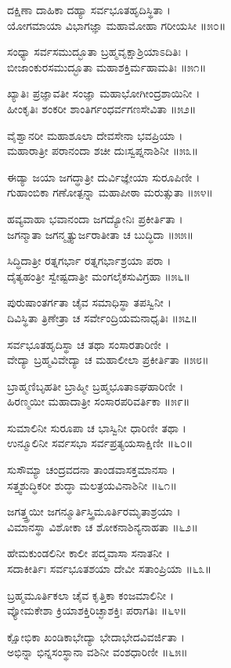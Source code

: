 ದಕ್ಷಿಣಾ ದಾಹಿಕಾ ದಹ್ಯಾ ಸರ್ವಭೂತಹೃದಿಸ್ಥಿತಾ ।\\
ಯೋಗಮಾಯಾ ವಿಭಾಗಜ್ಞಾ ಮಹಾಮೋಹಾ ಗರೀಯಸೀ ॥೫೦॥

ಸಂಧ್ಯಾ ಸರ್ವಸಮುದ್ಭೂತಾ ಬ್ರಹ್ಮವೃಕ್ಷಾಶ್ರಿಯಾಽದಿತಿಃ ।\\
ಬೀಜಾಂಕುರಸಮುದ್ಭೂತಾ ಮಹಾಶಕ್ತಿರ್ಮಹಾಮತಿಃ ॥೫೧॥

ಖ್ಯಾತಿಃ ಪ್ರಜ್ಞಾವತೀ ಸಂಜ್ಞಾ ಮಹಾಭೋಗೀಂದ್ರಶಾಯಿನೀ ।\\
ಹೀಂಕೃತಿಃ ಶಂಕರೀ ಶಾಂತಿರ್ಗಂಧರ್ವಗಣಸೇವಿತಾ ॥೫೨॥

ವೈಶ್ವಾನರೀ ಮಹಾಶೂಲಾ ದೇವಸೇನಾ ಭವಪ್ರಿಯಾ ।\\
ಮಹಾರಾತ್ರೀ ಪರಾನಂದಾ ಶಚೀ ದುಃಸ್ವಪ್ನನಾಶಿನೀ ॥೫೩॥

ಈಡ್ಯಾ ಜಯಾ ಜಗದ್ಧಾತ್ರೀ ದುರ್ವಿಜ್ಞೇಯಾ ಸುರೂಪಿಣೀ ।\\
ಗುಹಾಂಬಿಕಾ ಗಣೋತ್ಪನ್ನಾ ಮಹಾಪೀಠಾ ಮರುತ್ಸುತಾ ॥೫೪॥

ಹವ್ಯವಾಹಾ ಭವಾನಂದಾ ಜಗದ್ಯೋನಿಃ ಪ್ರಕೀರ್ತಿತಾ ।\\
ಜಗನ್ಮಾತಾ ಜಗನ್ಮೃತ್ಯುರ್ಜರಾತೀತಾ ಚ ಬುದ್ಧಿದಾ ॥೫೫॥

ಸಿದ್ಧಿದಾತ್ರೀ ರತ್ನಗರ್ಭಾ ರತ್ನಗರ್ಭಾಶ್ರಯಾ ಪರಾ ।\\
ದೈತ್ಯಹಂತ್ರೀ ಸ್ವೇಷ್ಟದಾತ್ರೀ ಮಂಗಲೈಕಸುವಿಗ್ರಹಾ ॥೫೬॥

ಪುರುಷಾಂತರ್ಗತಾ ಚೈವ ಸಮಾಧಿಸ್ಥಾ ತಪಸ್ವಿನೀ ।\\
ದಿವಿಸ್ಥಿತಾ ತ್ರಿಣೇತ್ರಾ ಚ ಸರ್ವೇಂದ್ರಿಯಮನಾಧೃತಿಃ ॥೫೭॥

ಸರ್ವಭೂತಹೃದಿಸ್ಥಾ ಚ ತಥಾ ಸಂಸಾರತಾರಿಣೀ ।\\
ವೇದ್ಯಾ ಬ್ರಹ್ಮವಿವೇದ್ಯಾ ಚ ಮಹಾಲೀಲಾ ಪ್ರಕೀರ್ತಿತಾ ॥೫೮॥

ಬ್ರಾಹ್ಮಣಿಬೃಹತೀ ಬ್ರಾಹ್ಮೀ ಬ್ರಹ್ಮಭೂತಾಽಘಹಾರಿಣೀ ।\\
ಹಿರಣ್ಮಯೀ ಮಹಾದಾತ್ರೀ ಸಂಸಾರಪರಿವರ್ತಿಕಾ ॥೫೯॥

ಸುಮಾಲಿನೀ ಸುರೂಪಾ ಚ ಭಾಸ್ವಿನೀ ಧಾರಿಣೀ ತಥಾ ।\\
ಉನ್ಮೂಲಿನೀ ಸರ್ವಸಭಾ ಸರ್ವಪ್ರತ್ಯಯಸಾಕ್ಷಿಣೀ ॥೬೦॥

ಸುಸೌಮ್ಯಾ ಚಂದ್ರವದನಾ ತಾಂಡವಾಸಕ್ತಮಾನಸಾ ।\\
ಸತ್ತ್ವಶುದ್ಧಿಕರೀ ಶುದ್ಧಾ ಮಲತ್ರಯವಿನಾಶಿನೀ ॥೬೧॥

ಜಗತ್ತ್ತ್ರಯೀ ಜಗನ್ಮೂರ್ತಿಸ್ತ್ರಿಮೂರ್ತಿರಮೃತಾಶ್ರಯಾ ।\\
ವಿಮಾನಸ್ಥಾ ವಿಶೋಕಾ ಚ ಶೋಕನಾಶಿನ್ಯನಾಹತಾ ॥೬೨॥

ಹೇಮಕುಂಡಲಿನೀ ಕಾಲೀ ಪದ್ಮವಾಸಾ ಸನಾತನೀ ।\\
ಸದಾಕೀರ್ತಿಃ ಸರ್ವಭೂತಶಯಾ ದೇವೀ ಸತಾಂಪ್ರಿಯಾ ॥೬೩॥

ಬ್ರಹ್ಮಮೂರ್ತಿಕಲಾ ಚೈವ ಕೃತ್ತಿಕಾ ಕಂಜಮಾಲಿನೀ ।\\
ವ್ಯೋಮಕೇಶಾ ಕ್ರಿಯಾಶಕ್ತಿರಿಚ್ಛಾಶಕ್ತಿಃ ಪರಾಗತಿಃ ॥೬೪॥

ಕ್ಷೋಭಿಕಾ ಖಂಡಿಕಾಭೇದ್ಯಾ ಭೇದಾಭೇದವಿವರ್ಜಿತಾ ।\\
ಅಭಿನ್ನಾ ಭಿನ್ನಸಂಸ್ಥಾನಾ ವಶಿನೀ ವಂಶಧಾರಿಣೀ ॥೬೫॥

